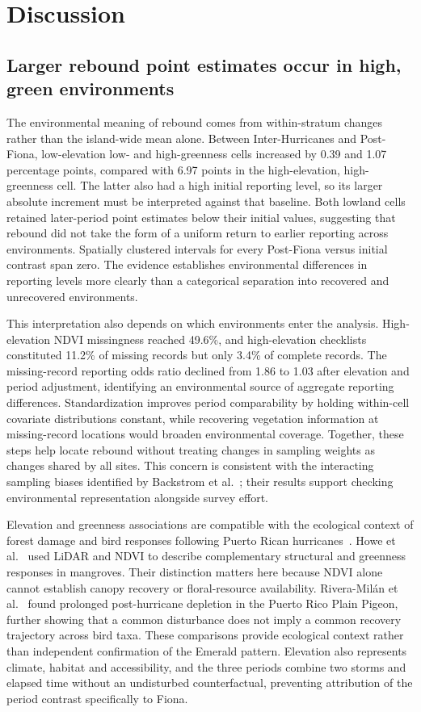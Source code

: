 \section{Discussion}
\subsection{Larger rebound point estimates occur in high, green environments}
The environmental meaning of rebound comes from within-stratum changes rather than the island-wide mean alone. Between Inter-Hurricanes and Post-Fiona, low-elevation low- and high-greenness cells increased by 0.39 and 1.07 percentage points, compared with 6.97 points in the high-elevation, high-greenness cell. The latter also had a high initial reporting level, so its larger absolute increment must be interpreted against that baseline. Both lowland cells retained later-period point estimates below their initial values, suggesting that rebound did not take the form of a uniform return to earlier reporting across environments. Spatially clustered intervals for every Post-Fiona versus initial contrast span zero. The evidence establishes environmental differences in reporting levels more clearly than a categorical separation into recovered and unrecovered environments.

This interpretation also depends on which environments enter the analysis. High-elevation NDVI missingness reached 49.6\%, and high-elevation checklists constituted 11.2\% of missing records but only 3.4\% of complete records. The missing-record reporting odds ratio declined from 1.86 to 1.03 after elevation and period adjustment, identifying an environmental source of aggregate reporting differences. Standardization improves period comparability by holding within-cell covariate distributions constant, while recovering vegetation information at missing-record locations would broaden environmental coverage. Together, these steps help locate rebound without treating changes in sampling weights as changes shared by all sites. This concern is consistent with the interacting sampling biases identified by Backstrom et al.~\cite{backstrom2025}; their results support checking environmental representation alongside survey effort.

Elevation and greenness associations are compatible with the ecological context of forest damage and bird responses following Puerto Rican hurricanes~\cite{uriarte2019,wunderle1995}. Howe et al.~\cite{howe2025} used LiDAR and NDVI to describe complementary structural and greenness responses in mangroves. Their distinction matters here because NDVI alone cannot establish canopy recovery or floral-resource availability. Rivera-Milán et al.~\cite{rivera2025} found prolonged post-hurricane depletion in the Puerto Rico Plain Pigeon, further showing that a common disturbance does not imply a common recovery trajectory across bird taxa. These comparisons provide ecological context rather than independent confirmation of the Emerald pattern. Elevation also represents climate, habitat and accessibility, and the three periods combine two storms and elapsed time without an undisturbed counterfactual, preventing attribution of the period contrast specifically to Fiona.

